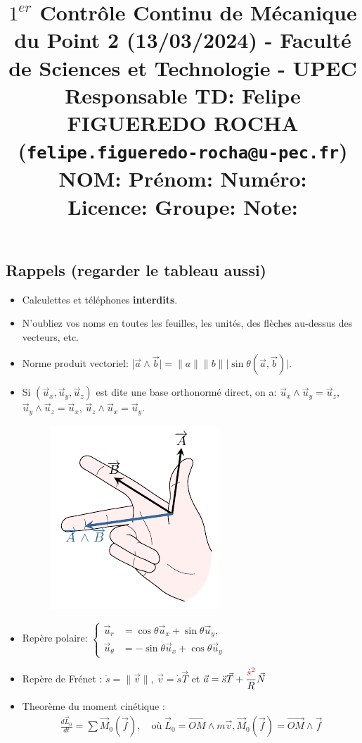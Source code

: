 \documentclass[french,10pt,twocolumn]{article}
\title{\vspace{-1cm} \large $1^{er}$ Contrôle Continu de Mécanique du Point 2 (13/03/2024) - 	Faculté de Sciences et Technologie - UPEC \\ 	Responsable TD: Felipe FIGUEREDO ROCHA (\texttt{felipe.figueredo-rocha@u-pec.fr}) \\
NOM:\underline{\hspace{7cm}} Prénom: \underline{\hspace{5cm}}  Numéro: \underline{\hspace{2cm}} \\
Licence:\underline{\hspace{7cm}} Groupe: \underline{\hspace{5cm}} Note: \underline{\hspace{1.5cm}}
 \vspace{-2cm}}
\author{}
\date{}
\begin{document}
	\maketitle
	
	\vspace{-0.5cm}
	\subsection*{Rappels (regarder le tableau aussi)}
	\begin{itemize}
		\item Calculettes et téléphones \textbf{interdits}.
		\item N'oubliez vos noms en toutes les feuilles, les unités, des flèches au-dessus des vecteurs, etc.
		\item Norme produit vectoriel: |$\vec{a} \wedge \vec{b}| =  \|a\| \|b\| |\sin{\theta}(\vec{a}, \vec{b})|$.
		\item Si $(\vec{u}_x, \vec{u}_y, \vec{u}_z)$ est dite une base orthonormé direct, on a: $\vec{u}_x \wedge \vec{u}_y = \vec{u}_z$, $\vec{u}_y \wedge \vec{u}_z = \vec{u}_x$, $\vec{u}_z \wedge \vec{u}_x = \vec{u}_y$.
		\begin{figure}[h!]
			\centering
			\includegraphics[width=0.3\linewidth]{regle_de_la_main_droite}
			\caption*{}
			\label{fig:regledelamaindroite}
		\end{figure}
	\vspace{-1cm}
		\item Repère polaire:
		$ \begin{cases}
			\vec{u}_r &= \cos{\theta} \Vec{u}_x + \sin{\theta} \Vec{u}_y,\\ 
			\vec{u}_{\theta} &= -\sin{\theta} \vec{u}_x + \cos{\theta} \Vec{u}_y
			\end{cases}
		$ 	
		\item Repère de Frénet : $\dot{s} = \|\vec{v}\|$, $\vec{v} = \dot{s} \vec{T}$ et 
		$\vec{a} = \ddot{s} \vec{T} + \dfrac{\color{red}{\dot{s}^2}}{R} \vec{N}$
		\item Theorème du moment cinétique :
		\begin{align*}
		\frac{d \vec{L}_0}{d t} = \sum \vec{M}_0(\vec{f}), \quad \text{où} \; \vec{L}_0 = \vec{OM}\wedge m\vec{v}, \vec{M}_0(\vec{f}) = \vec{OM}\wedge \vec{f}
		\end{align*}
	\end{itemize}
	
\end{document}
